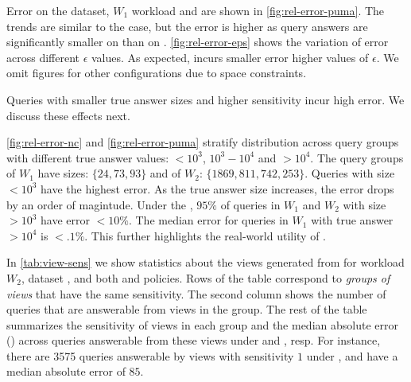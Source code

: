Error on the \dataPUMA dataset, $W_1$ workload and \personPolicy are shown in \cref{fig:rel-error-puma}. The  trends are similar to the \dataNC case, but the error is higher as query answers are significantly smaller on \dataPUMA than on \dataNC. 
\cref{fig:rel-error-eps} shows the variation of error across different $\epsilon$ values. As expected, \system incurs smaller error higher values of $\epsilon$. We omit figures for other configurations due to space constraints.

Queries with smaller true answer sizes and higher sensitivity incur high error. We discuss these effects next. 

\cref{fig:rel-error-nc} and \cref{fig:rel-error-puma} stratify  distribution across query groups with different true answer values: $<10^3$, $10^3-10^4$ and $>10^4$. The query groups of $W_1$ have sizes: $\{24, 73, 93\}$ and of $W_2$: $\{1869, 811, 742, 253\}$. Queries with size $<10^3$ have the highest error. As the true answer size increases, the error drops by an order of magintude. Under the \personPolicy, $95\%$ of queries in $W_1$ and $W_2$ with size $>10^3$ have error $<10\%$. The median error for queries in $W_1$ with true answer $>10^4$ is $<.1\%$. This further highlights the real-world utility of \system.



%
In  \cref{tab:view-sens} we show statistics about the views generated from \system for workload $W_2$, dataset \dataNC, and both \persons and \housing policies.
Rows of the table correspond to \emph{groups of views} that have the same sensitivity. 
The  second column shows the number of queries that are answerable from views in the group.
The rest of the table summarizes the sensitivity of views in each group and the median absolute error () across queries answerable from these views under \persons and \householdPolicy, resp. For instance, there are 3575 queries answerable by views with sensitivity $1$ under \personPolicy, and have a median absolute error of $85$.

